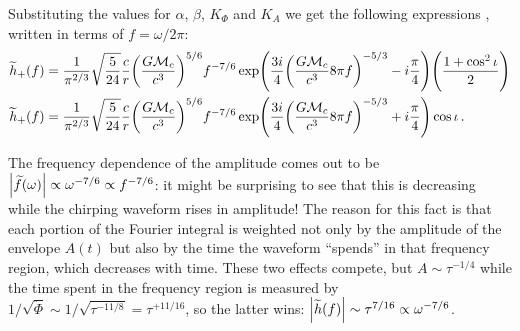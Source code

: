 \documentclass[main.tex]{subfiles}
\begin{document}
Substituting the values for \(\alpha \), \(\beta \), \(K_\Phi \) and \(K_A\) we get the following expressions \cite[eqs.\ 4.34--37]{maggioreGravitationalWavesVolume2007}, written in terms of \(f = \omega / 2\pi \): 
%
\begin{align} \label{eq:spa-waveforms}
\widetilde{h}_{+}(f) &= \frac{1}{\pi^{2/3}} \sqrt{ \frac{5}{24}} 
\frac{c}{r} \qty( \frac{G \mathcal{M}_c}{c^3})^{5/6} f^{-7/6} 
\exp(\frac{3i}{4} \qty(\frac{G \mathcal{M}_c}{c^3} 8 \pi f)^{-5/3} - i \frac{\pi}{4})
\qty( \frac{1 + \cos^2\iota }{2}) 
\\
\widetilde{h}_{+}(f) &= \frac{1}{\pi^{2/3}} \sqrt{ \frac{5}{24}} 
\frac{c}{r} \qty( \frac{G \mathcal{M}_c}{c^3})^{5/6} f^{-7/6} 
\exp(\frac{3i}{4} \qty(\frac{G \mathcal{M}_c}{c^3} 8 \pi f)^{-5/3} + i \frac{\pi}{4})
\cos \iota 
\,.
\end{align}

The frequency dependence of the amplitude comes out to be \(\abs{\widetilde{f}(\omega )} \propto \omega^{-7/6} \propto f^{-7/6}\):  it might be surprising to see that this is decreasing while the chirping waveform rises in amplitude! 
The reason for this fact is that each portion of the Fourier integral is weighted not only by the amplitude of the envelope \(A(t)\) but also by the time the waveform ``spends'' in that frequency region, which decreases with time. 
These two effects compete, but \(A \sim \tau^{-1/4}\) while the time spent in the frequency region is measured by \(1/ \sqrt{\ddot{\Phi}} \sim 1/ \sqrt{\tau^{-11/8}} = \tau^{+11/16}\), so the latter wins: \(\abs{\widetilde{h}(f)} \sim \tau^{7/16} \propto \omega^{-7/6}\). 
\end{document}
